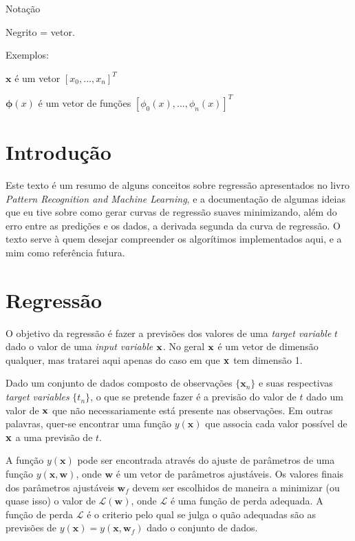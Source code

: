 \documentclass{article}
\begin{document}
Notação

Negrito = vetor.

Exemplos:

\(\textbf{x}\) é um vetor \([x_0,...,x_n]^T\)

\(\boldsymbol{\phi}(x)\) é um vetor de funções \([\phi_0(x),...,\phi_n(x)]^T\)

\section{Introdução}

Este texto é um resumo de alguns conceitos sobre regressão apresentados no livro \emph{Pattern Recognition and Machine Learning},
e a documentação de algumas ideias que eu tive sobre como gerar curvas de regressão suaves minimizando, além
do erro entre as predições e os dados, a derivada segunda da curva de regressão. O texto serve à quem
desejar compreender os algorítimos implementados aqui, e a mim como referência futura.

\section{Regressão}

O objetivo da regressão é fazer a previsões dos valores de uma \emph{target variable} \(t\) dado o valor de uma
\emph{input variable} \(\bf x\). No geral \(\bf x\) é um vetor de dimensão qualquer, mas tratarei aqui apenas do
caso em que \( \bf x \) tem dimensão 1.

Dado um conjunto de dados composto de observações \( \{ \textbf{x}_n \} \) e suas respectivas
\emph{target variables} \( \{t_n\} \), o que se pretende fazer é a previsão do valor de \(t\)
dado um valor de \(\bf x\) que não necessariamente está presente nas observações. Em outras palavras,
quer-se encontrar uma função \( y(\textbf{x}) \) que associa cada valor possível de \(\bf x\) a uma previsão de
\(t\).

A função \( y(\textbf{x}) \) pode ser encontrada através do ajuste de parâmetros de uma função
\( y(\textbf{x}, \textbf{w}) \), onde \( \textbf{w} \) é um vetor de parâmetros ajustáveis. Os valores
finais dos parâmetros ajustáveis \( \textbf{w}_f \) devem ser escolhidos de maneira a minimizar
(ou quase isso) o valor de \( \mathcal{L}(\textbf{w}) \), onde \( \mathcal{L} \) é uma função de perda
adequada. A função de perda \( \mathcal{L} \) é o criterio pelo qual se julga o quão adequadas são as
previsões de \( y(\textbf{x}) = y(\textbf{x}, \textbf{w}_f) \) dado o conjunto de dados.
\end{document}
